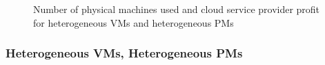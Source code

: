 \begin{figure} [!htp]
  \centering
   \quad
  \caption{ Number of physical machines used and cloud service provider profit for heterogeneous VMs and heterogeneous PMs  }
  \label{result3}
\end{figure}

\subsubsection{Heterogeneous VMs, Heterogeneous PMs}

